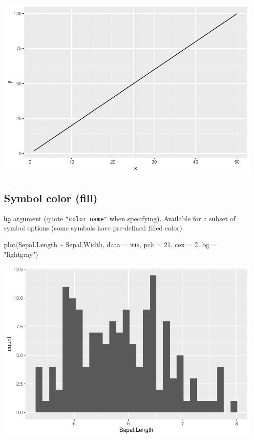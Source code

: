 \documentclass[
]{book}
\newenvironment{Shaded}{\begin{snugshade}}{\end{snugshade}}
\newcommand{\AttributeTok}[1]{\textcolor[rgb]{0.77,0.63,0.00}{#1}}
\newcommand{\DecValTok}[1]{\textcolor[rgb]{0.00,0.00,0.81}{#1}}
\newcommand{\FunctionTok}[1]{\textcolor[rgb]{0.00,0.00,0.00}{#1}}
\newcommand{\NormalTok}[1]{#1}
\newcommand{\SpecialCharTok}[1]{\textcolor[rgb]{0.00,0.00,0.00}{#1}}
\newcommand{\StringTok}[1]{\textcolor[rgb]{0.31,0.60,0.02}{#1}}
\begin{document}
\begin{center}\includegraphics{biostats_files/figure-latex/unnamed-chunk-119-1} \end{center}

\hypertarget{symbol-color-fill}{%
\subsection{Symbol color (fill)}\label{symbol-color-fill}}

\texttt{bg} argument (quote \texttt{"color\ name"} when specifying). Available for a subset of symbol options (some symbols have pre-defined filled color).

\begin{Shaded}
\begin{Highlighting}[]
\FunctionTok{plot}\NormalTok{(Sepal.Length }\SpecialCharTok{\textasciitilde{}}\NormalTok{ Sepal.Width, }\AttributeTok{data =}\NormalTok{ iris,}
     \AttributeTok{pch =} \DecValTok{21}\NormalTok{, }\AttributeTok{cex =} \DecValTok{2}\NormalTok{, }\AttributeTok{bg =} \StringTok{"lightgray"}\NormalTok{)}
\end{Highlighting}
\end{Shaded}

\begin{center}\includegraphics{biostats_files/figure-latex/unnamed-chunk-120-1} \end{center}
\end{document}
